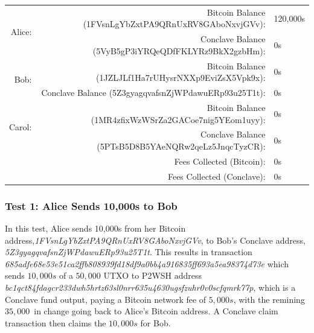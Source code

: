 \documentclass{report}
\begin{document}
			
			\begin{center}
			\bgroup
			\small
			\def\arraystretch{1.5}
			\begin{tabular}{|r|r|l|}
			\hline
			\multirow{2}{*}{Alice:}    & Bitcoin Balance (1FVsnLgYbZxtPA9QRnUxRV8GAboNxvjGVv):    & 120,000s \\ \cline{2-3} 
						               & Conclave Balance (5VyB5gP3iYRQeQDfFKLYRz9BkX2gzbHm):   & 0s \\ \hline
			\multirow{2}{*}{Bob:}      & Bitcoin Balance (1JZLJLf1Ha7rUHysrNXXp9EviZsX5Vpk9x):    & 0s \\ \cline{2-3} 
						               & Conclave Balance (5Z3gyagqvafsnZjWPdawuERp93u25T1t):   & 0s \\ \hline
			\multirow{2}{*}{Carol:}    & Bitcoin Balance (1MR4zfixWzWSrZa2GACoe7nig5YEom1uyy):    & 0s \\ \cline{2-3} 
						               & Conclave Balance (5PTsB5D8B5YAeNQRw2qeLz5JnqcTyzCR):   & 0s \\ \hline
			\multicolumn{2}{|r|}{Fees Collected (Bitcoin):}  & 0s \\ \hline
			\multicolumn{2}{|r|}{Fees Collected (Conclave):} & 0s \\ \hline
			\end{tabular}
			\egroup
			\bigbreak
			\normalsize
			\end{center}
			
			
			
			
			
			\subsubsection{Test 1: Alice Sends 10,000s to Bob}
			In this test, Alice sends 10,000s from her Bitcoin address,\textit{1FVsnLgYbZxtPA9QRnUxRV8GAboNxvjGVv}, to Bob's Conclave address, \textit{5Z3gyagqvafsnZjWPdawuERp93u25T1t}. This results in transaction \textit{685adfe68e53e51ca2ffb808939fd18df9a0bb4a916835ff693a5ea98374d73e} which sends $10,000s$ of a $50,000$ UTXO to P2WSH address \textit{bc1qct84fdagcr233dwh5hrtz63sl0nrr635u4630ugsfzuhr0v0scfqmrk77p}, which is a Conclave fund output, paying a Bitcoin network fee of $5,000s$, with the remining $35,000$ in change going back to Alice's Bitcoin address. A Conclave claim transaction then claims the $10,000s$ for Bob.\\
			
			
			
			
			
\end{document}
